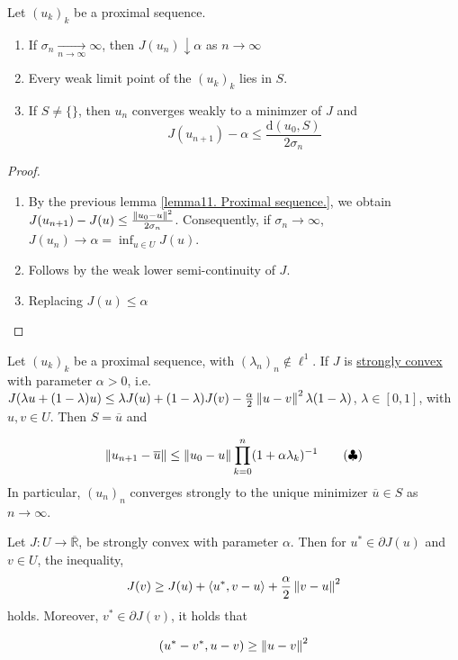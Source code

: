 \begin{theorem}
	Let $(u_k)_k$ be a proximal sequence.
	
	\begin{enumerate}
		\item If $\sigma_n \xrightarrow[n\rightarrow\infty]{}\infty$, then $J(u_n) \downarrow \alpha$ as $n\rightarrow \infty$
		\item Every weak limit point of the $(u_k)_k$ lies in $S$.
		\item  If $S\neq\{\}$, then $u_n$ converges weakly to a minimzer of $J$ and 
		\[
			J(u_{n+1}) - \alpha \leq \frac{\mathrm{d}(u_0, S)}{2 \sigma_n}
		\]
	\end{enumerate}
	\begin{proof} \
		\begin{enumerate}

		\item 		By the previous lemma \eqref{lemma11. Proximal sequence.}, we obtain $J(u_{n+1})-J(u) \leq \frac{\left\lVert u_0-u\right\rVert^2}{2\sigma_n}$. Consequently, if $\sigma_n \rightarrow \infty$, $J(u_n)\rightarrow \alpha = \inf_{u\in U } J(u)$.
		\item Follows by the weak lower semi-continuity of $J$.
		\item Replacing $J(u)\leq \alpha$
		\end{enumerate}
	\end{proof}
\end{theorem}

\begin{theorem}
	Let $(u_k)_k$ be a proximal sequence, with $(\lambda_n)_n \notin \ell^1$. If $J$ is \underline{strongly convex} with parameter $\alpha > 0$, i.e. $J(\lambda u + (1-\lambda)u) \leq \lambda J(u)+ (1-\lambda) J(v) -\frac{\alpha}{2} \left\lVert u-v\right\rVert^2\lambda (1-\lambda)$, $\lambda \in [0,1]$, with $u,v \in U$. Then $S={\overline{u}}$ and 
	
	\begin{equation}
		\label{eq11. Ineq Prod.}\left\lVert u_{n+1}-\overline{u}\right\rVert \leq \left\lVert u_0-u\right\rVert \prod_{k=0}^{n} (1+\alpha \lambda_k)^{-1} \tag{$\clubsuit$}
	\end{equation}
	In particular, $(u_n)_n$ converges strongly to the unique minimizer $\overline{u} \in S$ as $n\rightarrow \infty$.
\end{theorem}

\begin{lemma}
	Let $J:U\rightarrow \overline{\mathbb{R}}$, be strongly convex with parameter $\alpha$. Then for $u^* \in \partial J(u)$ and $v\in U$, the inequality,
	\begin{align}
		J(v)\geq J(u)+\langle u^*, v-u\rangle +\frac{\alpha}{2}\left\lVert v-u\right\rVert^2
	\end{align}
	holds. Moreover, $v^* \in \partial J(v)$, it holds that 
	
	\begin{equation}
		(u^*-v^*, u-v) \geq \left\lVert u-v\right\rVert^2
	\end{equation}
\end{lemma}

